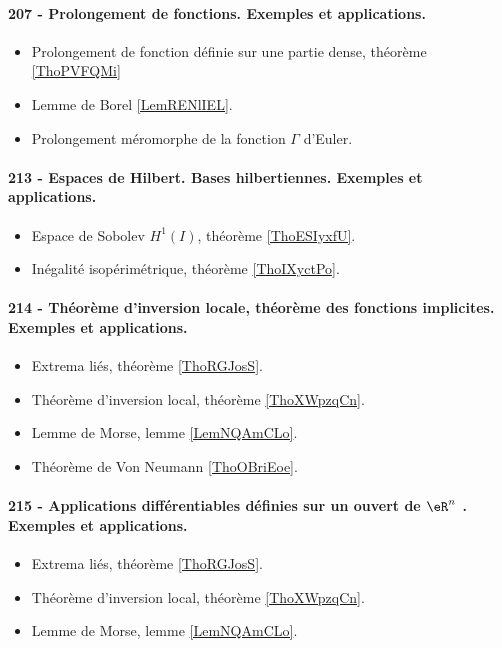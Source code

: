 \paragraph{207 - Prolongement de fonctions. Exemples et applications.}
\begin{itemize}
    \item Prolongement de fonction définie sur une partie dense, théorème \ref{ThoPVFQMi}
    \item Lemme de Borel \ref{LemRENlIEL}.
    \item Prolongement méromorphe de la fonction \( \Gamma\) d'Euler.
\end{itemize}
\paragraph{213 - Espaces de Hilbert. Bases hilbertiennes. Exemples et applications.}
\begin{itemize}
    \item Espace de Sobolev \( H^1(I)\), théorème \ref{ThoESIyxfU}.
    \item Inégalité isopérimétrique, théorème \ref{ThoIXyctPo}.
\end{itemize}
\paragraph{214 - Théorème d’inversion locale, théorème des fonctions implicites. Exemples et applications.}
\begin{itemize}
    \item Extrema liés, théorème \ref{ThoRGJosS}.
    \item Théorème d'inversion local, théorème \ref{ThoXWpzqCn}.
    \item Lemme de Morse, lemme \ref{LemNQAmCLo}.
    \item Théorème de Von Neumann \ref{ThoOBriEoe}.
\end{itemize}
\paragraph{215 - Applications différentiables définies sur un ouvert de $\eR^n$ . Exemples et applications.}
\begin{itemize}
    \item Extrema liés, théorème \ref{ThoRGJosS}.
    \item Théorème d'inversion local, théorème \ref{ThoXWpzqCn}.
    \item Lemme de Morse, lemme \ref{LemNQAmCLo}.
\end{itemize}
